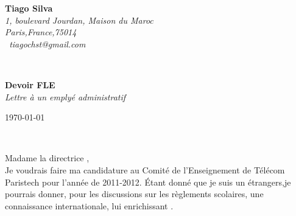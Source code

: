 \documentclass[11pt]{article}
\begin{document}
\hfill%
\begin{minipage}[t]{.6\textwidth}
\raggedleft%
{\bfseries Tiago Silva}\\[.35ex]
\small\itshape%
1, boulevard Jourdan, Maison du Maroc\\
Paris,France,75014\\[.35ex]
\Letter~tiagochst@gmail.com
\end{minipage}\\[1em]
%
\begin{minipage}[t]{.4\textwidth}
\raggedright%
{\bfseries Devoir FLE}\\[.35ex]
\small\itshape%
Lettre à un emplyé administratif\\
\end{minipage}
\hfill %
\begin{minipage}[t]{.4\textwidth}
\raggedleft %
\today
\end{minipage}\\[2em]
\raggedright


%



Madame la directrice ,\\[1.5em]
%


%



Je voudrais faire ma candidature au Comité de l'Enseignement de Télécom Paristech pour l’année de 2011-2012. Étant donné que je suis un étrangers,je pourrais donner, pour les discussions sur les règlements scolaires, une connaissance internationale, lui enrichissant .
\end{document}
